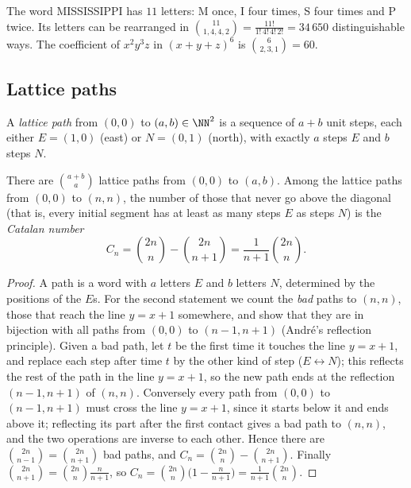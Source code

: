 \begin{example}\label{combinatorics:example-multinomial}
The word MISSISSIPPI has $11$ letters: M once, I four times, S four times and P twice. Its letters can be rearranged in $\binom{11}{1, 4, 4, 2} = \frac{11!}{1!\,4!\,4!\,2!} = 34\,650$ distinguishable
ways. The coefficient of $x^2y^3z$ in $(x + y + z)^6$ is $\binom{6}{2, 3, 1} = 60$.
\end{example}

\subsection{Lattice paths}\label{combinatorics:subsection-lattice-paths}

\begin{definition}\label{combinatorics:definition-lattice-path}
A \emph{lattice path} from $(0, 0)$ to $(a, b) \in \NN^2$ is a sequence of $a + b$ unit steps, each either $E = (1, 0)$ (east) or $N = (0, 1)$ (north), with exactly $a$ steps $E$ and $b$ steps $N$.
\end{definition}

\begin{proposition}\label{combinatorics:proposition-lattice-paths}
There are $\binom{a + b}{a}$ lattice paths from $(0, 0)$ to $(a, b)$. Among the lattice paths from $(0, 0)$ to $(n, n)$, the number of those that never go above the diagonal (that is, every initial
segment has at least as many steps $E$ as steps $N$) is the \emph{Catalan number}
\[
C_n = \binom{2n}{n} - \binom{2n}{n + 1} = \frac{1}{n + 1}\binom{2n}{n}.
\]
\end{proposition}

\begin{proof}
A path is a word with $a$ letters $E$ and $b$ letters $N$, determined by the positions of the $E$s. For the second statement we count the \emph{bad} paths to $(n, n)$, those that reach the line $y = x + 1$
somewhere, and show that they are in bijection with all paths from $(0, 0)$ to $(n - 1, n + 1)$ (André's reflection principle). Given a bad path, let $t$ be the first time it touches the line $y = x + 1$,
and replace each step after time $t$ by the other kind of step ($E \leftrightarrow N$); this reflects the rest of the path in the line $y = x + 1$, so the new path ends at the reflection $(n - 1, n + 1)$ of
$(n, n)$. Conversely every path from $(0, 0)$ to $(n - 1, n + 1)$ must cross the line $y = x + 1$, since it starts below it and ends above it; reflecting its part after the first contact gives a bad path to
$(n, n)$, and the two operations are inverse to each other. Hence there are $\binom{2n}{n - 1} = \binom{2n}{n + 1}$ bad paths, and $C_n = \binom{2n}{n} - \binom{2n}{n+1}$. Finally
$\binom{2n}{n+1} = \binom{2n}{n}\frac{n}{n + 1}$, so $C_n = \binom{2n}{n}\bigl(1 - \frac{n}{n+1}\bigr) = \frac{1}{n + 1}\binom{2n}{n}$.
\end{proof}

